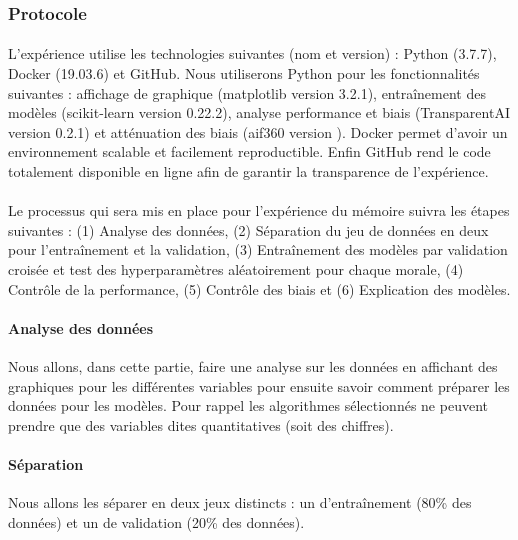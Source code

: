 \documentclass[10pt, french, a4paper]{report}
\begin{document}
\subsubsection{Protocole}

\paragraph{}
L'expérience utilise les technologies suivantes (nom et version) : Python (3.7.7), Docker (19.03.6) et GitHub. Nous utiliserons Python pour les fonctionnalités suivantes : affichage de graphique (matplotlib version 3.2.1), entraînement des modèles (scikit-learn version 0.22.2), analyse performance et biais (TransparentAI version 0.2.1) et atténuation des biais (aif360 version ). Docker permet d'avoir un environnement scalable et facilement reproductible. Enfin GitHub rend le code totalement disponible en ligne afin de garantir la transparence de l'expérience.

\paragraph{}
Le processus qui sera mis en place pour l'expérience du mémoire suivra les étapes suivantes : (1) Analyse des données, (2) Séparation du jeu de données en deux pour l'entraînement et la validation, (3) Entraînement des modèles par validation croisée et test des hyperparamètres aléatoirement pour chaque morale, (4) Contrôle de la performance, (5) Contrôle des biais et (6) Explication des modèles. %

\paragraph{Analyse des données} Nous allons, dans cette partie, faire une analyse sur les données en affichant des graphiques pour les différentes variables pour ensuite savoir comment préparer les données pour les modèles. Pour rappel les algorithmes sélectionnés ne peuvent prendre que des variables dites quantitatives (soit des chiffres).

\paragraph{Séparation} Nous allons les séparer en deux jeux distincts : un d'entraînement (80\% des données) et un de validation (20\% des données).
\end{document}
